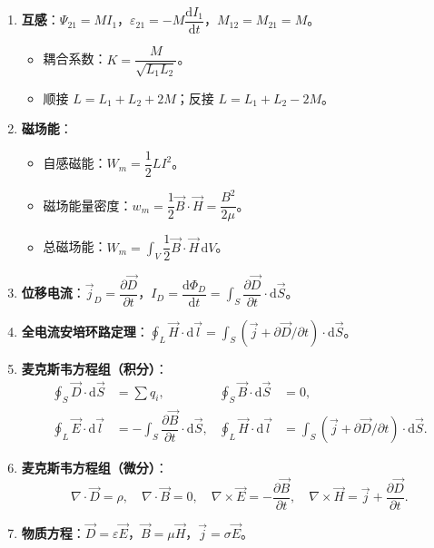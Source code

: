 \documentclass[12pt,a4paper]{ctexart}
\begin{document}
\begin{enumerate}[leftmargin=3em,label=\textbf{公式\arabic*}：,ref=公式\arabic*]
    \item \textbf{互感}：$\Psi_{21}=MI_1$，$\varepsilon_{21}=-M\dfrac{\mathrm dI_1}{\mathrm dt}$，$M_{12}=M_{21}=M$。
    \begin{itemize}
        \item 耦合系数：$K=\dfrac{M}{\sqrt{L_1L_2}}$。
        \item 顺接 $L=L_1+L_2+2M$；反接 $L=L_1+L_2-2M$。
    \end{itemize}

    \item \textbf{磁场能}：
    \begin{itemize}
        \item 自感磁能：$W_m=\dfrac{1}{2}LI^2$。
        \item 磁场能量密度：$w_m=\dfrac{1}{2}\vec B\cdot\vec H=\dfrac{B^2}{2\mu}$。
        \item 总磁场能：$W_m=\displaystyle\int_V\dfrac{1}{2}\vec B\cdot\vec H\,\mathrm dV$。
    \end{itemize}

    \item \textbf{位移电流}：$\vec j_D=\dfrac{\partial\vec D}{\partial t}$，$I_D=\dfrac{\mathrm d\Phi_D}{\mathrm dt}=\displaystyle\int_S\dfrac{\partial\vec D}{\partial t}\cdot\mathrm d\vec S$。

    \item \textbf{全电流安培环路定理}：$\displaystyle\oint_L\vec H\cdot\mathrm d\vec l=\displaystyle\int_S(\vec j+\partial\vec D/\partial t)\cdot\mathrm d\vec S$。

    \item \textbf{麦克斯韦方程组（积分）}：
    \begin{align}
        \oint_S\vec D\cdot\mathrm d\vec S &= \sum q_i, &
        \oint_S\vec B\cdot\mathrm d\vec S &= 0, \\
        \oint_L\vec E\cdot\mathrm d\vec l &= -\int_S\dfrac{\partial\vec B}{\partial t}\cdot\mathrm d\vec S, &
        \oint_L\vec H\cdot\mathrm d\vec l &= \int_S(\vec j+\partial\vec D/\partial t)\cdot\mathrm d\vec S.
    \end{align}

    \item \textbf{麦克斯韦方程组（微分）}：
    \[
        \nabla\cdot\vec D=\rho,\quad \nabla\cdot\vec B=0,\quad \nabla\times\vec E=-\dfrac{\partial\vec B}{\partial t},\quad \nabla\times\vec H=\vec j+\dfrac{\partial\vec D}{\partial t}.
    \]

    \item \textbf{物质方程}：$\vec D=\varepsilon\vec E$，$\vec B=\mu\vec H$，$\vec j=\sigma\vec E$。


\end{enumerate}
\end{document}
